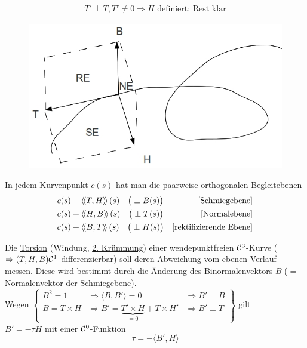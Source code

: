 \begin{beweis}
 \begin{align*}
  T'\perp T, T' \ne 0 \Rightarrow H \text{ definiert; Rest klar}
 \end{align*}

\end{beweis}

\begin{figure}[ht]
 \centering
 \includegraphics[scale=0.3]{Bilder/Bsp2.jpg}
\end{figure}

\begin{folgerung}
 In jedem Kurvenpunkt \(c(s)\) hat man die paarweise orthogonalen \uline{Begleitebenen}
 \begin{align*}
  &c(s) + \left\langle\!\left\langle T,H \right\rangle\!\right\rangle(s) \quad \big(\perp B(s)\big) & \text{[Schmiegebene]} \\
  &c(s) + \left\langle\!\left\langle H,B \right\rangle\!\right\rangle(s) \quad \big(\perp T(s)\big) & \text{[Normalebene]} \\
  &c(s) + \left\langle\!\left\langle B,T \right\rangle\!\right\rangle(s) \quad \big(\perp H(s)\big) & \text{[rektifizierende Ebene]} 
 \end{align*}
\end{folgerung}

Die \uline{Torsion} (Windung, \uline{2. Krümmung}) einer wendepunktfreien \(\mathcal{C}^3\)-Kurve (\(\Rightarrow (T,H,B) \mathcal{C}^1\)-differen\-zier\-bar) soll deren Abweichung vom ebenen Verlauf messen. Diese wird bestimmt durch die Änder\-ung des Binormalenvektors \(B\) (\(=\) Normalenvektor der Schmiegebene). \\
Wegen \(\begin{Bmatrix}
         B^2 = 1 & \Rightarrow \langle B,B'\rangle = 0  &\Rightarrow B' \perp B \\
         B = T \times H & \Rightarrow B' = \underbrace{T' \times H}_{= 0} + T \times H' &\Rightarrow B' \perp T
        \end{Bmatrix}\) gilt \\
        \(B' = -\tau H\) mit einer \(\mathcal{C}^0\)-Funktion
        \[
         \tau = -\langle B', H\rangle
        \]
        
